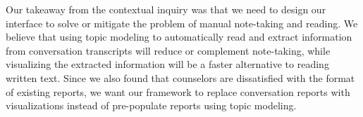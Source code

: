 Our takeaway from the contextual inquiry was that we need to design our interface to solve or mitigate the problem of manual note-taking and reading. We believe that using topic modeling to automatically read and extract information from conversation transcripts will reduce or complement note-taking, while visualizing the extracted information will be a faster alternative to reading written text. Since we also found that counselors are dissatisfied with the format of existing reports, we want our framework to replace conversation reports with visualizations instead of pre-populate reports using topic modeling.
